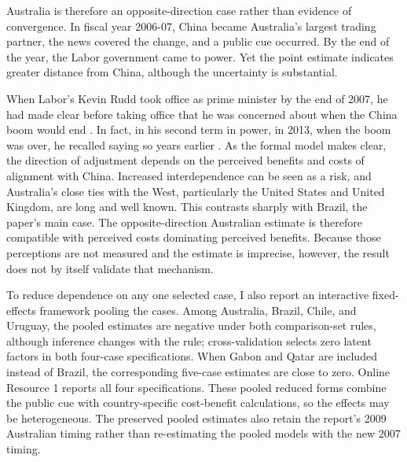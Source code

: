 \documentclass[referee,pdflatex,sn-basic]{sn-jnl}
\theoremstyle{thmstylethree}
\begin{document}
Australia is therefore an opposite-direction case rather than evidence of convergence. In fiscal year 2006-07, China became Australia's largest trading partner, the news covered the change, and a public cue occurred. By the end of the year, the Labor government came to power. Yet the point estimate indicates greater distance from China, although the uncertainty is substantial.

When Labor's Kevin Rudd took office as prime minister by the end of 2007, he had made clear before taking office that he was concerned about when the China boom would end \citep{uhlmann2007rudd}. In fact, in his second term in power, in 2013, when the boom was over, he recalled saying so years earlier \citep{rudd2013economy}. As the formal model makes clear, the direction of adjustment depends on the perceived benefits and costs of alignment with China. Increased interdependence can be seen as a risk, and Australia's close ties with the West, particularly the United States and United Kingdom, are long and well known. This contrasts sharply with Brazil, the paper's main case. The opposite-direction Australian estimate is therefore compatible with perceived costs dominating perceived benefits. Because those perceptions are not measured and the estimate is imprecise, however, the result does not by itself validate that mechanism.

To reduce dependence on any one selected case, I also report an interactive fixed-effects framework pooling the cases. Among Australia, Brazil, Chile, and Uruguay, the pooled estimates are negative under both comparison-set rules, although inference changes with the rule; cross-validation selects zero latent factors in both four-case specifications. When Gabon and Qatar are included instead of Brazil, the corresponding five-case estimates are close to zero. Online Resource 1 reports all four specifications. These pooled reduced forms combine the public cue with country-specific cost-benefit calculations, so the effects may be heterogeneous. The preserved pooled estimates also retain the report's 2009 Australian timing rather than re-estimating the pooled models with the new 2007 timing.
\end{document}
